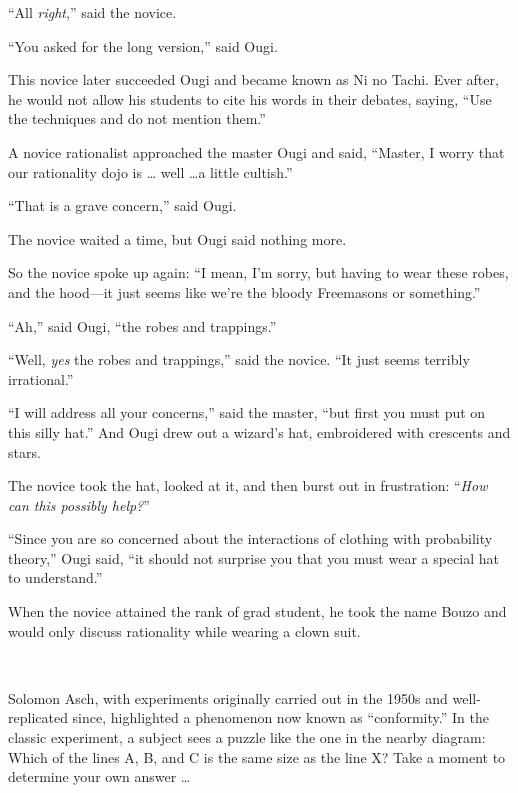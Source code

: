{
 ``All \textit{right},'' said
the novice.}

{
 ``You asked for the long
version,'' said Ougi.}

{
 This novice later succeeded Ougi and became known as Ni no Tachi.
Ever after, he would not allow his students to cite his words in their
debates, saying, ``Use the techniques and do not
mention them.''}

{
 A novice rationalist approached the master Ougi and said,
``Master, I worry that our rationality dojo is \ldots
well \ldots a little cultish.''}

{
 ``That is a grave concern,''
said Ougi.}

{
 The novice waited a time, but Ougi said nothing more.}

{
 So the novice spoke up again: ``I mean,
I'm sorry, but having to wear these robes, and the
hood---it just seems like we're the bloody Freemasons
or something.''}

{
 ``Ah,'' said Ougi,
``the robes and trappings.''}

{
 ``Well, \textit{yes} the robes and
trappings,'' said the novice. ``It
just seems terribly irrational.''}

{
 ``I will address all your
concerns,'' said the master, ``but
first you must put on this silly hat.'' And Ougi drew
out a wizard's hat, embroidered with crescents and
stars.}

{
 The novice took the hat, looked at it, and then burst out in
frustration: ``\textit{How can this possibly
help?}''}

{
 ``Since you are so concerned about the
interactions of clothing with probability theory,''
Ougi said, ``it should not surprise you that you must
wear a special hat to understand.''}

{
 When the novice attained the rank of grad student, he took the
name Bouzo and would only discuss rationality while wearing a clown
suit.}

\myendsectiontext




{
 ~}

{
 Solomon Asch, with experiments originally carried out in the 1950s
and well-replicated since, highlighted a phenomenon now known as
``conformity.'' In the classic
experiment, a subject sees a puzzle like the one in the nearby diagram:
Which of the lines A, B, and C is the same size as the line X? Take a
moment to determine your own answer \ldots}


